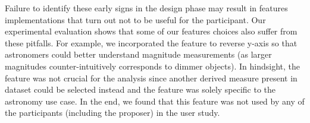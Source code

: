 {\begin{itemize}
\end{itemize}
\par Failure to identify these early signs in the design phase may result in features implementations that turn out not to be useful for the participant. 
Our experimental evaluation shows that some of our features choices also suffer from these pitfalls. For example, we incorporated the feature to reverse y-axis so that astronomers could better understand magnitude measurements (as larger magnitudes counter-intuitively corresponds to dimmer objects). In hindsight, the feature was not crucial for the analysis since another derived measure present in dataset could be selected instead and the feature was solely specific to the astronomy use case. In the end, we found that this feature was not used by any of the participants (including the proposer) in the user study.%
}